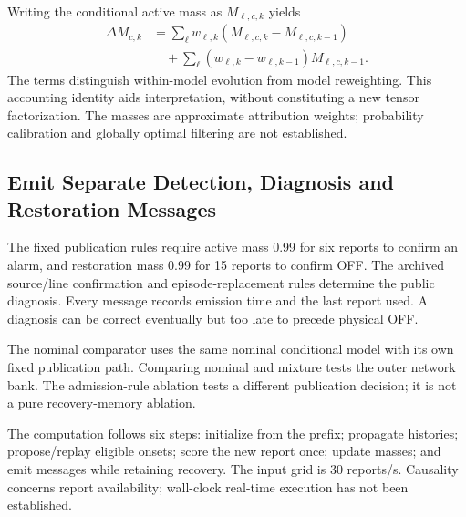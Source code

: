 Writing the conditional active mass as $M_{\ell,c,k}$ yields
\begin{align}
 \Delta M_{c,k}&=\sum_\ell w_{\ell,k}
               (M_{\ell,c,k}-M_{\ell,c,k-1})\nonumber\\
 &\quad+\sum_\ell(w_{\ell,k}-w_{\ell,k-1})M_{\ell,c,k-1}.
 \label{eq:continuous-delta}
\end{align}
The terms distinguish within-model evolution from model reweighting.
This accounting identity aids interpretation, without constituting a new
tensor factorization. The masses are approximate attribution weights;
probability calibration and globally optimal filtering are not established.

\subsection{Emit Separate Detection, Diagnosis and Restoration Messages}

The fixed publication rules require active mass 0.99 for six reports to
confirm an alarm, and restoration mass 0.99 for 15 reports to confirm OFF.
The archived source/line confirmation and episode-replacement rules
determine the public diagnosis. Every message records emission time and
the last report used. A diagnosis can be correct eventually but too late
to precede physical OFF.

The nominal comparator uses the same nominal conditional model with its
own fixed publication path. Comparing nominal and mixture tests the outer
network bank. The admission-rule ablation tests a different publication
decision; it is not a pure recovery-memory ablation.

The computation follows six steps: initialize from the prefix; propagate
histories; propose/replay eligible onsets; score the new report once;
update masses; and emit messages while retaining recovery. The input grid
is 30 reports/s. Causality concerns report availability; wall-clock
real-time execution has not been established.
